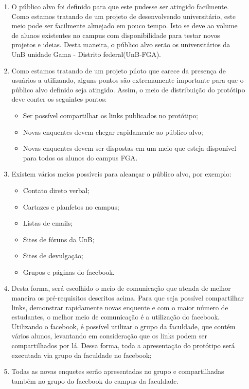 \begin{enumerate}
    \item O público alvo foi definido para que este pudesse ser atingido facilmente. Como estamos tratando de um
        projeto de desenvolvendo universitário, este meio pode ser facilmente almejado em pouco tempo. Isto se
        deve ao volume de alunos existentes no campus com disponibilidade para testar novos projetos e ideias.
        Desta maneira, o público alvo serão os universitários da UnB unidade Gama - Distrito federal(UnB-FGA).
    \item Como estamos tratando de um projeto piloto que carece da presença de usuários a utilizando, alguns
        pontos são extremamente importante para que o público alvo definido seja atingido. Assim, o meio de
        distribuição do protótipo deve conter os seguintes pontos:
        \begin{itemize}
            \item Ser possível compartilhar os links publicados no protótipo;
            \item Novas enquentes devem chegar rapidamente ao público alvo;
            \item Novas enquentes devem ser dispostas em um meio que esteja disponível para todos os
                alunos do campus FGA.
        \end{itemize}
    \item Existem vários meios possíveis para alcançar o público alvo, por exemplo:
        \begin{itemize}
            \item Contato direto verbal;
            \item Cartazes e planfetos no campus;
            \item Listas de emails;
            \item Sites de fóruns da UnB;
            \item Sites de devulgação;
            \item Grupos e páginas do facebook.
        \end{itemize}
    \item Desta forma, será escolhido o meio de comunicação que atenda de melhor maneira os pré-requisitos descritos acima. Para que
        seja possível compartilhar links, demonstrar rapidamente novas enquente e com o maior número de estudantes, o melhor meio de
        comunicação é a utilização do facebook. Utilizando o facebook, é possível utilizar o grupo da faculdade, que contém vários alunos,
        levantando em consideração que os links podem ser compartilhados por lá. Dessa forma, toda a apresentação do protótipo será executada
        via grupo da faculdade no facebook;
    \item Todas as novas enquetes serão apresentadas no grupo e compartilhadas também no grupo do facebook do campus da faculdade.
\end{enumerate}

